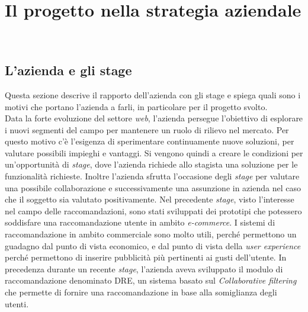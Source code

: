 
\chapter{Il progetto nella strategia aziendale}
\label{cap:il-progetto-nella-strategia-aziendale}
\\




\section{L'azienda e gli stage}
Questa sezione descrive il rapporto dell'azienda con gli stage e spiega quali sono i motivi che portano l'azienda a farli, in particolare per il progetto svolto.\\Data la forte evoluzione del settore \emph{web}, l'azienda persegue l'obiettivo di esplorare i nuovi segmenti del campo per mantenere un ruolo di rilievo nel mercato. Per questo motivo c'è l'esigenza di sperimentare continuamente nuove soluzioni, per valutare possibili impieghi e vantaggi. Si vengono quindi a creare le condizioni per un'opportunità di \emph{stage}, dove l'azienda richiede allo stagista una soluzione per le funzionalità richieste. Inoltre l'azienda sfrutta l'occasione degli \emph{stage} per valutare una possibile collaborazione e successivamente una assunzione in azienda nel caso che il soggetto sia valutato positivamente. Nel precedente \emph{stage}, visto l'interesse nel campo delle raccomandazioni, sono stati sviluppati dei prototipi che potessero soddisfare una raccomandazione utente in ambito \emph{e-commerce}. I sistemi di raccomandazione in ambito commerciale sono molto utili, perché permettono un guadagno dal punto di vista economico, e dal punto di vista della \emph{user experience} perché permettono di inserire pubblicità più pertinenti ai gusti dell'utente. In precedenza durante un recente \emph{stage}, l'azienda aveva sviluppato il modulo di raccomandazione denominato DRE, un sistema basato sul \emph{Collaborative filtering} che permette di fornire una raccomandazione in base alla somiglianza degli utenti.
\newpage




